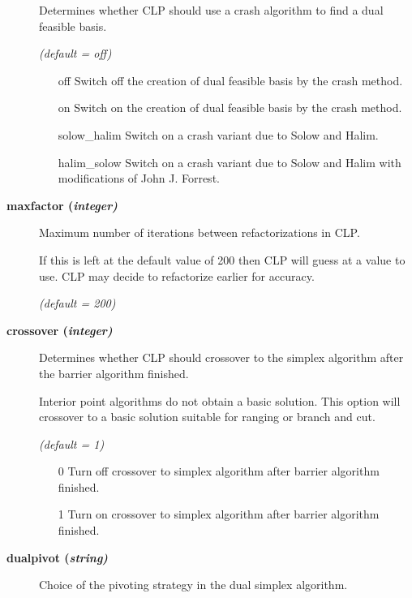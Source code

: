 \begin{description}
Determines whether CLP should use a crash algorithm to find a dual feasible basis.

\textsl{(default = off)}
\begin{itemize}
\item[off] 
Switch off the creation of dual feasible basis by the crash method.
\item[on] 
Switch on the creation of dual feasible basis by the crash method.
\item[solow\_halim] 
Switch on a crash variant due to Solow and Halim.
\item[halim\_solow] 
Switch on a crash variant due to Solow and Halim with modifications of John J. Forrest.
\end{itemize}

\item[\label{maxfactor}\hypertarget{maxfactor}
{\textbf{maxfactor (\slshape{integer})}}]\hspace{1.0in}

Maximum number of iterations between refactorizations in CLP.

If this is left at the default value of 200 then CLP will guess at a value to use.
CLP may decide to refactorize earlier for accuracy.

\textsl{(default = 200)}

\item[\label{crossover}\hypertarget{crossover}
{\textbf{crossover (\slshape{integer})}}]\hspace{1.0in}

Determines whether CLP should crossover to the simplex algorithm after the barrier algorithm finished.

Interior point algorithms do not obtain a basic solution.
This option will crossover to a basic solution suitable for ranging or branch and cut.

\textsl{(default = 1)}
\begin{itemize}
\item[0] 
Turn off crossover to simplex algorithm after barrier algorithm finished.
\item[1] 
Turn on crossover to simplex algorithm after barrier algorithm finished.
\end{itemize}

\item[\label{dualpivot}\hypertarget{dualpivot}
{\textbf{dualpivot (\slshape{string})}}]\hspace{1.0in}

Choice of the pivoting strategy in the dual simplex algorithm.


\end{description}
